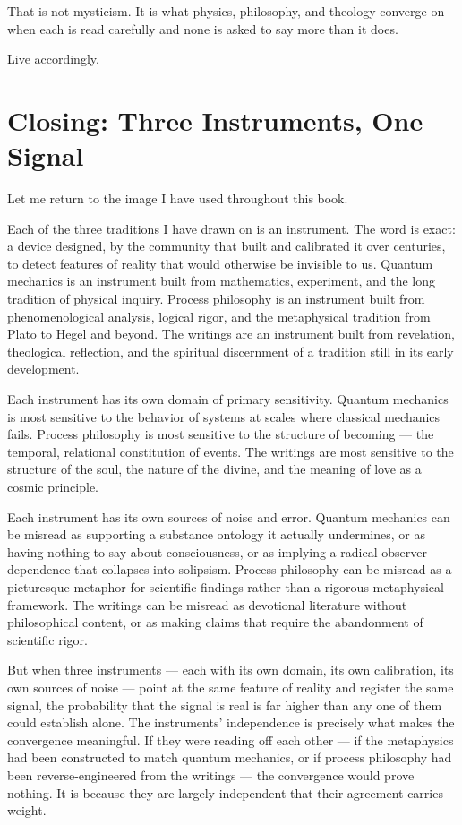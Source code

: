 That is not mysticism.  It is what physics, philosophy, and theology converge
on when each is read carefully and none is asked to say more than it does.

Live accordingly.


\section*{Closing: Three Instruments, One Signal}
\label{sec:ch15-closing}

Let me return to the image I have used throughout this book.

Each of the three traditions I have drawn on is an instrument.  The word is
exact: a device designed, by the community that built and calibrated it over
centuries, to detect features of reality that would otherwise be invisible to
us.  Quantum mechanics is an instrument built from mathematics, experiment, and
the long tradition of physical inquiry.  Process philosophy is an instrument
built from phenomenological analysis, logical rigor, and the metaphysical
tradition from Plato to Hegel and beyond.  The \bahai writings are an instrument
built from revelation, theological reflection, and the spiritual discernment of
a tradition still in its early development.

Each instrument has its own domain of primary sensitivity.  Quantum mechanics
is most sensitive to the behavior of systems at scales where classical mechanics
fails.  Process philosophy is most sensitive to the structure of becoming ---
the temporal, relational constitution of events.  The \bahai writings are most
sensitive to the structure of the soul, the nature of the divine, and the
meaning of love as a cosmic principle.

Each instrument has its own sources of noise and error.  Quantum mechanics can
be misread as supporting a substance ontology it actually undermines, or as
having nothing to say about consciousness, or as implying a radical observer-
dependence that collapses into solipsism.  Process philosophy can be misread
as a picturesque metaphor for scientific findings rather than a rigorous
metaphysical framework.  The \bahai writings can be misread as devotional
literature without philosophical content, or as making claims that require
the abandonment of scientific rigor.

But when three instruments --- each with its own domain, its own calibration,
its own sources of noise --- point at the same feature of reality and register
the same signal, the probability that the signal is real is far higher than any
one of them could establish alone.  The
instruments' independence is precisely what makes the convergence meaningful.
If they were reading off each other --- if the \bahai metaphysics had been
constructed to match quantum mechanics, or if process philosophy had been
reverse-engineered from the \bahai writings --- the convergence would prove
nothing.  It is because they are largely independent that their agreement
carries weight.

